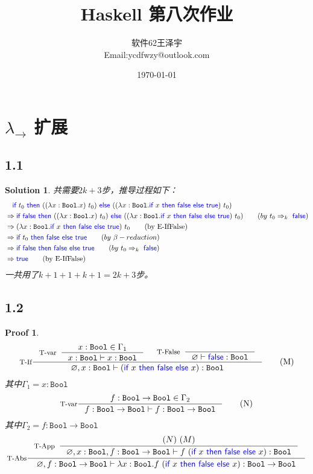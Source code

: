 \documentclass[11pt, a4paper]{article}
\title{\textbf{Haskell 第八次作业}}
\author{软件62\quad  2016013258\quad  王泽宇\\ Email:ycdfwzy@outlook.com}
\date{\today}
\newcommand{\hei}{\CJKfamily{hei}}
\newtheorem{Proof}{Proof}
\newtheorem{Solution}{Solution}
\let\t\texttt
\let\emptyset\varnothing
\let\to\rightarrow
\newcommand{\Bool}{\t{Bool}}
\newcommand{\kword}[1]{{\color{blue} \textsf{#1}}}
\newcommand{\True}{\kword{true}}
\newcommand{\False}{\kword{false}}
\newcommand{\If}{\kword{if}}
\newcommand{\Then}{\kword{then}}
\newcommand{\Else}{\kword{else}}
\begin{document}
\maketitle


\section{$\lambda_\to$ 扩展}

    \subsection*{1.1}
    \begin{Solution}
        共需要$2k+3$步，推导过程如下：
        \begin{align}
            &\quad \If~t_0~\Then~((\lambda x:\Bool.x)~t_0)~\Else~((\lambda x:\Bool.\If~x~\Then~\False~\Else~\True)~t_0) \notag \\
            &\Rightarrow \If~\False~\Then~((\lambda x:\Bool.x)~t_0)~\Else~((\lambda x:\Bool.\If~x~\Then~\False~\Else~\True)~t_0) \tag{$by~t_0\Rightarrow_k~\False$} \\
            &\Rightarrow (\lambda x:\Bool.\If~x~\Then~\False~\Else~\True)~t_0 \tag{by~E-IfFalse} \\
            &\Rightarrow \If~t_0~\Then~\False~\Else~\True \tag{$by~\beta-reduction$} \\
            &\Rightarrow \If~\False~\Then~\False~\Else~\True \tag{$by~t_0\Rightarrow_k~\False$} \\
            &\Rightarrow \True \tag{by~E-IfFalse}
        \end{align}
        一共用了$k+1+1+k+1=2k+3$步。
    \end{Solution}
    \subsection*{1.2}
    \begin{Proof}
        \begin{align*}
            \inference[T-If]{\inference[T-var]{x:\Bool \in \Gamma_1}{ x:\Bool \vdash x:\Bool} & \inference[T-False]{}{\emptyset \vdash \False : \Bool}}{\emptyset,x:\Bool \vdash (\If~x~\Then~\False~\Else~x):\Bool} \tag{M}
        \end{align*}
        其中$\Gamma_1 = x:\Bool$
        \begin{align*}
            \inference[T-var]{f:\Bool\rightarrow \Bool \in \Gamma_2}{f:\Bool\rightarrow \Bool\vdash f : \Bool\rightarrow \Bool} \tag{N}
        \end{align*}
        其中$\Gamma_2 = f:\Bool\rightarrow \Bool$
        \begin{align*}
            \inference[T-Abs]{\inference[T-App]{(N) ~ (M) }{\emptyset,x:\Bool,f:\Bool\rightarrow \Bool \vdash f~(\If~x~\Then~\False~\Else~x) : \Bool}}{\emptyset, f:\Bool \to \Bool \vdash \lambda x:\Bool.f~(\If~x~\Then~\False~\Else~x) : \Bool \to \Bool}
        \end{align*}
    \end{Proof}
\end{document}
